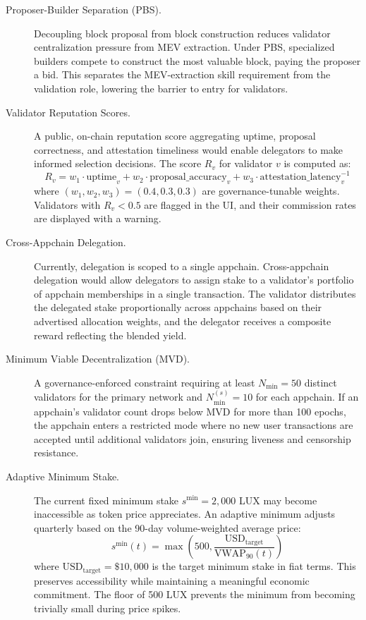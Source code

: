 \documentclass[11pt,a4paper]{article}
\begin{document}
\begin{description}
    \item[Proposer-Builder Separation (PBS).] Decoupling block proposal from block construction reduces validator centralization pressure from MEV extraction. Under PBS, specialized builders compete to construct the most valuable block, paying the proposer a bid. This separates the MEV-extraction skill requirement from the validation role, lowering the barrier to entry for validators.

    \item[Validator Reputation Scores.] A public, on-chain reputation score aggregating uptime, proposal correctness, and attestation timeliness would enable delegators to make informed selection decisions. The score $R_v$ for validator $v$ is computed as:
    \begin{equation}
        R_v = w_1 \cdot \text{uptime}_v + w_2 \cdot \text{proposal\_accuracy}_v + w_3 \cdot \text{attestation\_latency}_v^{-1}
    \end{equation}
    where $(w_1, w_2, w_3) = (0.4, 0.3, 0.3)$ are governance-tunable weights. Validators with $R_v < 0.5$ are flagged in the UI, and their commission rates are displayed with a warning.

    \item[Cross-Appchain Delegation.] Currently, delegation is scoped to a single appchain. Cross-appchain delegation would allow delegators to assign stake to a validator's portfolio of appchain memberships in a single transaction. The validator distributes the delegated stake proportionally across appchains based on their advertised allocation weights, and the delegator receives a composite reward reflecting the blended yield.

    \item[Minimum Viable Decentralization (MVD).] A governance-enforced constraint requiring at least $N_{\min} = 50$ distinct validators for the primary network and $N_{\min}^{(s)} = 10$ for each appchain. If an appchain's validator count drops below MVD for more than 100 epochs, the appchain enters a restricted mode where no new user transactions are accepted until additional validators join, ensuring liveness and censorship resistance.

    \item[Adaptive Minimum Stake.] The current fixed minimum stake $s^{\min} = 2{,}000$ LUX may become inaccessible as token price appreciates. An adaptive minimum adjusts quarterly based on the 90-day volume-weighted average price:
    \begin{equation}
        s^{\min}(t) = \max\!\left(500, \frac{\text{USD}_{\text{target}}}{\text{VWAP}_{90}(t)}\right)
    \end{equation}
    where $\text{USD}_{\text{target}} = \$10{,}000$ is the target minimum stake in fiat terms. This preserves accessibility while maintaining a meaningful economic commitment. The floor of 500 LUX prevents the minimum from becoming trivially small during price spikes.


\end{description}
\end{document}
